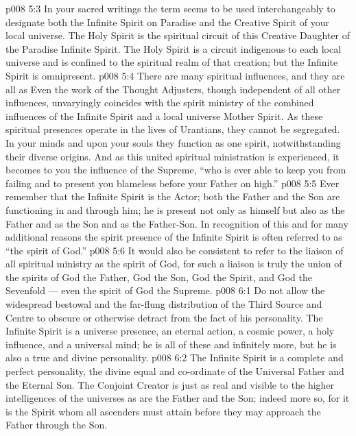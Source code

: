 \vs p008 5:3 \pc In your sacred writings the term  seems to be used interchangeably to designate both the Infinite Spirit on Paradise and the Creative Spirit of your local universe. The Holy Spirit is the spiritual circuit of this Creative Daughter of the Paradise Infinite Spirit. The Holy Spirit is a circuit indigenous to each local universe and is confined to the spiritual realm of that creation; but the Infinite Spirit is omnipresent.
\vs p008 5:4 \pc There are many spiritual influences, and they are all as  Even the work of the Thought Adjusters, though independent of all other influences, unvaryingly coincides with the spirit ministry of the combined influences of the Infinite Spirit and a local universe Mother Spirit. As these spiritual presences operate in the lives of Urantians, they cannot be segregated. In your minds and upon your souls they function as one spirit, notwithstanding their diverse origins. And as this united spiritual ministration is experienced, it becomes to you the influence of the Supreme, “who is ever able to keep you from failing and to present you blameless before your Father on high.”
\vs p008 5:5 Ever remember that the Infinite Spirit is the  Actor; both the Father and the Son are functioning in and through him; he is present not only as himself but also as the Father and as the Son and as the Father\hyp{}Son. In recognition of this and for many additional reasons the spirit presence of the Infinite Spirit is often referred to as “the spirit of God.”
\vs p008 5:6 It would also be consistent to refer to the liaison of all spiritual ministry as the spirit of God, for such a liaison is truly the union of the spirits of God the Father, God the Son, God the Spirit, and God the Sevenfold --- even the spirit of God the Supreme.
\vs p008 6:1 Do not allow the widespread bestowal and the far\hyp{}flung distribution of the Third Source and Centre to obscure or otherwise detract from the fact of his personality. The Infinite Spirit is a universe presence, an eternal action, a cosmic power, a holy influence, and a universal mind; he is all of these and infinitely more, but he is also a true and divine personality.
\vs p008 6:2 The Infinite Spirit is a complete and perfect personality, the divine equal and co\hyp{}ordinate of the Universal Father and the Eternal Son. The Conjoint Creator is just as real and visible to the higher intelligences of the universes as are the Father and the Son; indeed more so, for it is the Spirit whom all ascenders must attain before they may approach the Father through the Son.
